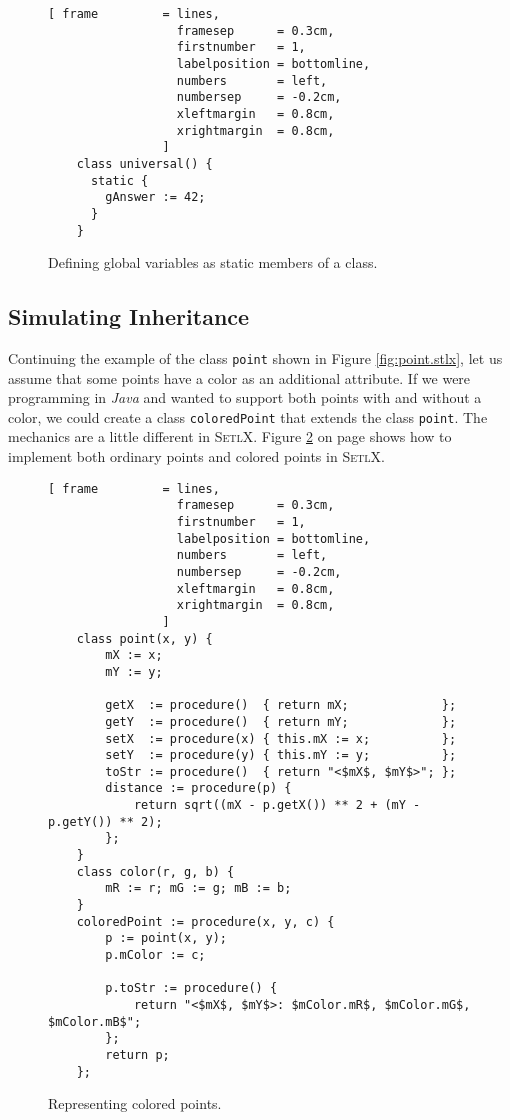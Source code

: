 \begin{figure}[!ht]
\centering
\begin{Verbatim}[ frame         = lines, 
                  framesep      = 0.3cm, 
                  firstnumber   = 1,
                  labelposition = bottomline,
                  numbers       = left,
                  numbersep     = -0.2cm,
                  xleftmargin   = 0.8cm,
                  xrightmargin  = 0.8cm,
                ]
    class universal() {
      static {
        gAnswer := 42;
      }
    }
\end{Verbatim}
\vspace*{-0.3cm}
\caption{Defining global variables as static members of a class.}
\label{fig:universal.stlx}
\end{figure}



\subsection{Simulating Inheritance}
Continuing the example of the class \texttt{point} shown in Figure \ref{fig:point.stlx}, let us
assume that some points have a color as an additional attribute.  If we were programming in
\textsl{Java} and wanted to support both points with and without a color, we could create a class
\texttt{coloredPoint} that extends the class \texttt{point}.  The mechanics are a little different
in \textsc{SetlX}.  Figure \ref{fig:point-colored.stlx} on page \pageref{fig:point-colored.stlx}
shows how to implement both ordinary points and colored points in \textsc{SetlX}.

\begin{figure}[!ht]
\centering
\begin{Verbatim}[ frame         = lines, 
                  framesep      = 0.3cm, 
                  firstnumber   = 1,
                  labelposition = bottomline,
                  numbers       = left,
                  numbersep     = -0.2cm,
                  xleftmargin   = 0.8cm,
                  xrightmargin  = 0.8cm,
                ]
    class point(x, y) {
        mX := x;
        mY := y;
    
        getX  := procedure()  { return mX;             };
        getY  := procedure()  { return mY;             };
        setX  := procedure(x) { this.mX := x;          };
        setY  := procedure(y) { this.mY := y;          };
        toStr := procedure()  { return "<$mX$, $mY$>"; };
        distance := procedure(p) {
            return sqrt((mX - p.getX()) ** 2 + (mY - p.getY()) ** 2);
        };
    }
    class color(r, g, b) {
        mR := r; mG := g; mB := b;
    }    
    coloredPoint := procedure(x, y, c) {
        p := point(x, y);
        p.mColor := c;
        
        p.toStr := procedure() {
            return "<$mX$, $mY$>: $mColor.mR$, $mColor.mG$, $mColor.mB$";
        };
        return p;
    };
\end{Verbatim}
\vspace*{-0.3cm}
\caption{Representing colored points.}
\label{fig:point-colored.stlx}
\end{figure}

